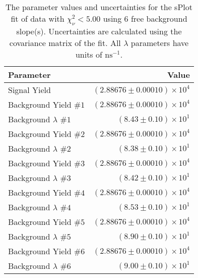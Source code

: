 
\begin{table}
    \begin{center}
        \begin{tabular}{lr}\toprule
            Parameter & Value \\\midrule
            Signal Yield & $(2.88676 \pm 0.00010) \times 10^{4}$ \\
            Background Yield $\#1$ & $(2.88676 \pm 0.00010) \times 10^{4}$ \\
            Background $\lambda$ $\#1$ & $(8.43 \pm 0.10) \times 10^{1}$ \\
            Background Yield $\#2$ & $(2.88676 \pm 0.00010) \times 10^{4}$ \\
            Background $\lambda$ $\#2$ & $(8.38 \pm 0.10) \times 10^{1}$ \\
            Background Yield $\#3$ & $(2.88676 \pm 0.00010) \times 10^{4}$ \\
            Background $\lambda$ $\#3$ & $(8.42 \pm 0.10) \times 10^{1}$ \\
            Background Yield $\#4$ & $(2.88676 \pm 0.00010) \times 10^{4}$ \\
            Background $\lambda$ $\#4$ & $(8.53 \pm 0.10) \times 10^{1}$ \\
            Background Yield $\#5$ & $(2.88676 \pm 0.00010) \times 10^{4}$ \\
            Background $\lambda$ $\#5$ & $(8.90 \pm 0.10) \times 10^{1}$ \\
            Background Yield $\#6$ & $(2.88676 \pm 0.00010) \times 10^{4}$ \\
            Background $\lambda$ $\#6$ & $(9.00 \pm 0.10) \times 10^{1}$ \\\bottomrule
        \end{tabular}
        \caption{The parameter values and uncertainties for the sPlot fit of data with $\chi^2_\nu < 5.00$ using 6 free background slope(s). Uncertainties are calculated using the covariance matrix of the fit. All $\lambda$ parameters have units of $\si{\nano\second}^{-1}$.}
    \end{center}
\end{table}

